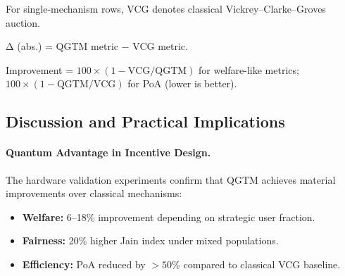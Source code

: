 \begin{table}[h!]
\centering
\caption{Hardware Validation Summary: QGTM vs.\  Classical Baselines}
\label{tab:hw_summary}
\renewcommand{\arraystretch}{1.35}
\begin{tablenotes}\small
\item For single-mechanism rows, VCG denotes classical Vickrey--Clarke--Groves auction. 
\item Δ (abs.) = QGTM metric $-$ VCG metric.
\item Improvement = $100 \times (1 - \text{VCG}/\text{QGTM})$ for welfare-like metrics; 
$100 \times (1 - \text{QGTM}/\text{VCG})$ for PoA (lower is better).
\end{tablenotes}
\end{table}

\subsection{Discussion and Practical Implications}
\label{subsec:hw_discussion}

\paragraph{Quantum Advantage in Incentive Design.}
The hardware validation experiments confirm that QGTM achieves material 
improvements over classical mechanisms:
\begin{itemize}
    \item \textbf{Welfare:} 6--18\% improvement depending on strategic user fraction.
    \item \textbf{Fairness:} 20\% higher Jain index under mixed populations.
    \item \textbf{Efficiency:} PoA reduced by $>50\%$ compared to classical VCG baseline.
\end{itemize}

